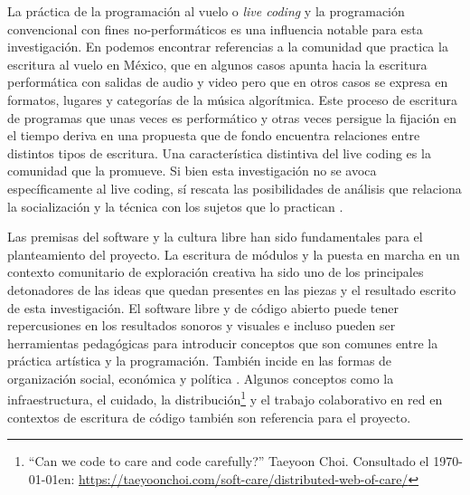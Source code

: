\documentclass[12pt,letterpaper, twoside, openright,
headinclude,footinclude,BCOR5mm,
numbers=noenddot,cleardoublepage=empty,
tablecaptionabove]{article}
\begin{document}

La práctica de la programación al vuelo o \emph{live coding} y la programación convencional con fines no-performáticos es una influencia notable para esta investigación. En \cite{villasenor} podemos encontrar referencias a la comunidad que practica la escritura al vuelo en México, que en algunos casos apunta hacia la escritura performática con salidas de audio y video pero que en otros casos se expresa en formatos, lugares y categorías de la música algorítmica\citep{jro2}. Este proceso de escritura de programas que unas veces es performático y otras veces persigue la fijación en el tiempo deriva en una propuesta que de fondo encuentra relaciones entre distintos tipos de escritura. Una característica distintiva del live coding es la comunidad que la promueve. Si bien esta investigación no se avoca específicamente al live coding, sí rescata las posibilidades de análisis que relaciona la socialización y la técnica con los sujetos que lo practican \citep{diProspero}. %



Las premisas del software y la cultura libre han sido fundamentales para el planteamiento del proyecto. La escritura de módulos y la puesta en marcha en un contexto comunitario de exploración creativa ha sido uno de los principales detonadores de las ideas que quedan presentes en las piezas y el resultado escrito de esta investigación. El software libre y de código abierto puede tener repercusiones en los resultados sonoros y visuales e incluso pueden ser herramientas pedagógicas para introducir conceptos que son comunes entre la práctica artística y la programación. También incide en las formas de organización social, económica y política \citep{jorgeDavid2021}. Algunos conceptos como la infraestructura, el cuidado, la distribución\footnote{``Can we code to care and code carefully?'' Taeyoon Choi. Consultado el \today en: \url{https://taeyoonchoi.com/soft-care/distributed-web-of-care/}} y el trabajo colaborativo en red \citep{hernaniRed} en contextos de escritura de código también son referencia para el proyecto. 
\end{document}
